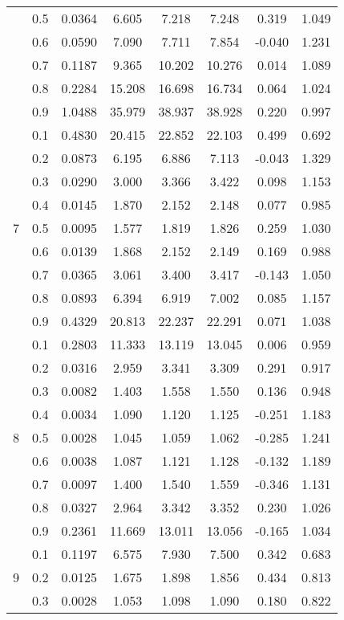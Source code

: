 \documentclass[11pt,a4paper]{report}
\begin{document}
\begin{longtable}{ | c | c || c | c | c | c | c | c | }
 & 0.5 & 0.0364 & 6.605 & 7.218 & 7.248 & 0.319 & 1.049 \\
 & 0.6 & 0.0590 & 7.090 & 7.711 & 7.854 & -0.040 & 1.231 \\
 & 0.7 & 0.1187 & 9.365 & 10.202 & 10.276 & 0.014 & 1.089 \\
 & 0.8 & 0.2284 & 15.208 & 16.698 & 16.734 & 0.064 & 1.024 \\
 & 0.9 & 1.0488 & 35.979 & 38.937 & 38.928 & 0.220 & 0.997 \\
 \hline
\multirow{9}{*}{7} & 0.1 & 0.4830 & 20.415 & 22.852 & 22.103 & 0.499 & 0.692 \\
 & 0.2 & 0.0873 & 6.195 & 6.886 & 7.113 & -0.043 & 1.329 \\
 & 0.3 & 0.0290 & 3.000 & 3.366 & 3.422 & 0.098 & 1.153 \\
 & 0.4 & 0.0145 & 1.870 & 2.152 & 2.148 & 0.077 & 0.985 \\
 & 0.5 & 0.0095 & 1.577 & 1.819 & 1.826 & 0.259 & 1.030 \\
 & 0.6 & 0.0139 & 1.868 & 2.152 & 2.149 & 0.169 & 0.988 \\
 & 0.7 & 0.0365 & 3.061 & 3.400 & 3.417 & -0.143 & 1.050 \\
 & 0.8 & 0.0893 & 6.394 & 6.919 & 7.002 & 0.085 & 1.157 \\
 & 0.9 & 0.4329 & 20.813 & 22.237 & 22.291 & 0.071 & 1.038 \\
 \hline
\multirow{9}{*}{8} & 0.1 & 0.2803 & 11.333 & 13.119 & 13.045 & 0.006 & 0.959 \\
 & 0.2 & 0.0316 & 2.959 & 3.341 & 3.309 & 0.291 & 0.917 \\
 & 0.3 & 0.0082 & 1.403 & 1.558 & 1.550 & 0.136 & 0.948 \\
 & 0.4 & 0.0034 & 1.090 & 1.120 & 1.125 & -0.251 & 1.183 \\
 & 0.5 & 0.0028 & 1.045 & 1.059 & 1.062 & -0.285 & 1.241 \\
 & 0.6 & 0.0038 & 1.087 & 1.121 & 1.128 & -0.132 & 1.189 \\
 & 0.7 & 0.0097 & 1.400 & 1.540 & 1.559 & -0.346 & 1.131 \\
 & 0.8 & 0.0327 & 2.964 & 3.342 & 3.352 & 0.230 & 1.026 \\
 & 0.9 & 0.2361 & 11.669 & 13.011 & 13.056 & -0.165 & 1.034 \\
 \hline
\multirow{9}{*}{9} & 0.1 & 0.1197 & 6.575 & 7.930 & 7.500 & 0.342 & 0.683 \\
 & 0.2 & 0.0125 & 1.675 & 1.898 & 1.856 & 0.434 & 0.813 \\
 & 0.3 & 0.0028 & 1.053 & 1.098 & 1.090 & 0.180 & 0.822 \\

\end{longtable}
\end{document}
